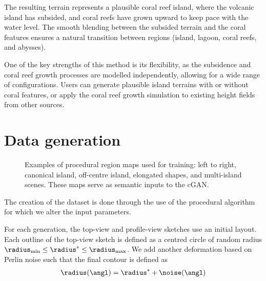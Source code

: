 The resulting terrain represents a plausible coral reef island, where the volcanic island has subsided, and coral reefs have grown upward to keep pace with the water level. The smooth blending between the subsided terrain and the coral features ensures a natural transition between regions (island, lagoon, coral reefs, and abysses).

One of the key strengths of this method is its flexibility, as the subsidence and coral reef growth processes are modelled independently, allowing for a wide range of configurations. Users can generate plausible island terrains with or without coral features, or apply the coral reef growth simulation to existing height fields from other sources.



\section{Data generation}
\label{sec:coral-island-dataset-generation}



\begin{figure}
\caption{Examples of procedural region maps used for training: left to right, canonical island, off-centre island, elongated shapes, and multi-island scenes. These maps serve as semantic inputs to the cGAN.}
\label{fig:coral-island-difficulties-dataset}
\end{figure}

The creation of the dataset is done through the use of the procedural algorithm for which we alter the input parameters.

For each generation, the top-view and profile-view sketches use an initial layout. Each outline of the top-view sketch is defined as a centred circle of random radius $\radius_\text{min} \leq \radius^* \leq \radius_\text{max}$. We add another deformation based on Perlin noise such that the final contour is defined as
\begin{align}
\radius(\angl) = \radius^* + \noise(\angl)
\end{align}


